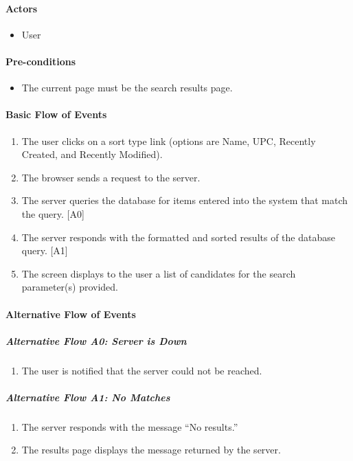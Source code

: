 \documentclass{article}
\begin{document}
\paragraph{Actors}
\begin{itemize}
\item User
\end{itemize}

\paragraph{Pre-conditions}
\begin{itemize}
\item The current page must be the search results page.
\end{itemize}

\paragraph{Basic Flow of Events}
\begin{enumerate}
\item The user clicks on a sort type link (options are Name, UPC, Recently Created, and Recently Modified).
\item The browser sends a request to the server.
\item The server queries the database for items entered into the system that match the query. [A0]
\item The server responds with the formatted and sorted results of the database query. [A1]
\item The screen displays to the user a list of candidates for the search parameter(s) provided.
\end{enumerate}

\paragraph{Alternative Flow of Events}

\subparagraph{Alternative Flow A0: Server is Down}
\begin{enumerate}
\item The user is notified that the server could not be reached.
\end{enumerate}

\subparagraph{Alternative Flow A1: No Matches}
\begin{enumerate}
\item The server responds with the message ``No results.''
\item The results page displays the message returned by the server.
\end{enumerate}
\end{document}
